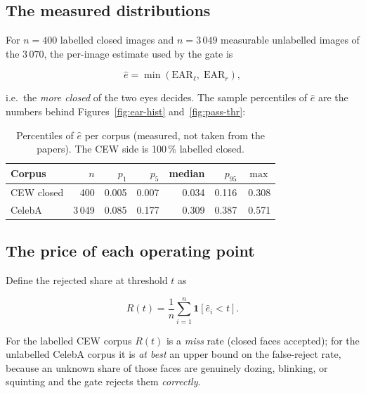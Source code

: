 \documentclass[11pt,a4paper]{article}
\begin{document}
\subsection{The measured distributions}

For $n=400$ labelled closed images and $n=3\,049$ measurable unlabelled
images of the $3\,070$, the per-image estimate used by the gate is

\begin{equation}
  \hat{e} = \min\!\left(\mathrm{EAR}_{\ell},\; \mathrm{EAR}_{r}\right),
\end{equation}

i.e.\ the \emph{more closed} of the two eyes decides. The sample
percentiles of $\hat{e}$ are the numbers behind Figures~\ref{fig:ear-hist}
and~\ref{fig:pass-thr}:

\begin{table}[H]
\centering
\caption{Percentiles of $\hat{e}$ per corpus (measured, not taken from
the papers). The CEW side is 100\,\% labelled closed.}
\label{tab:pct}
\renewcommand{\arraystretch}{1.25}
\begin{tabular}{@{}lrrrrrr@{}}
\toprule
\textbf{Corpus} & $n$ & $p_1$ & $p_5$ & \textbf{median} & $p_{95}$ & $\max$ \\
\midrule
CEW closed     & 400  & 0.005 & 0.007 & 0.034 & 0.116 & 0.308 \\
CelebA         & 3\,049 & 0.085 & 0.177 & 0.309 & 0.387 & 0.571 \\
\bottomrule
\end{tabular}
\end{table}

\subsection{The price of each operating point}

Define the rejected share at threshold $t$ as

\begin{equation}
  R(t) = \frac{1}{n}\sum_{i=1}^{n} \mathbf{1}\!\left[\hat{e}_i < t\right].
\end{equation}

For the labelled CEW corpus $R(t)$ is a \emph{miss} rate (closed
faces accepted); for the unlabelled CelebA corpus it is \emph{at best}
an upper bound on the false-reject rate, because an unknown share of
those faces are genuinely dozing, blinking, or squinting and the gate
rejects them \emph{correctly}.
\end{document}
